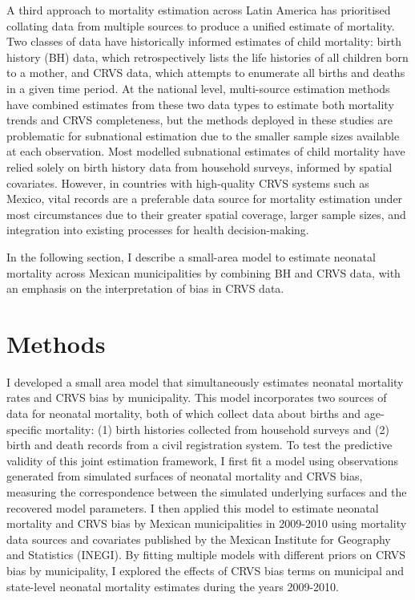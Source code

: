 \documentclass[
]{report}
\begin{document}
A third approach to mortality estimation across Latin America has prioritised collating data from multiple sources to produce a unified estimate of mortality. Two classes of data have historically informed estimates of child mortality: birth history (BH) data, which retrospectively lists the life histories of all children born to a mother, and CRVS data, which attempts to enumerate all births and deaths in a given time period. At the national level, multi-source estimation methods have combined estimates from these two data types to estimate both mortality trends and CRVS completeness,\autocite{Dicker2018,Fisker2019} but the methods deployed in these studies are problematic for subnational estimation due to the smaller sample sizes available at each observation. Most modelled subnational estimates of child mortality have relied solely on birth history data from household surveys, informed by spatial covariates.\autocite{Golding2017,Burstein2019,Wakefield2019} However, in countries with high-quality CRVS systems such as Mexico, vital records are a preferable data source for mortality estimation under most circumstances due to their greater spatial coverage, larger sample sizes, and integration into existing processes for health decision-making.\autocite{UnitedNationsStatisticsDivision2014}

In the following section, I describe a small-area model to estimate neonatal mortality across Mexican municipalities by combining BH and CRVS data, with an emphasis on the interpretation of bias in CRVS data.

\hypertarget{methods}{%
\section{Methods}\label{methods}}

I developed a small area model that simultaneously estimates neonatal mortality rates and CRVS bias by municipality. This model incorporates two sources of data for neonatal mortality, both of which collect data about births and age-specific mortality: (1) birth histories collected from household surveys and (2) birth and death records from a civil registration system. To test the predictive validity of this joint estimation framework, I first fit a model using observations generated from simulated surfaces of neonatal mortality and CRVS bias, measuring the correspondence between the simulated underlying surfaces and the recovered model parameters. I then applied this model to estimate neonatal mortality and CRVS bias by Mexican municipalities in 2009-2010 using mortality data sources and covariates published by the Mexican Institute for Geography and Statistics (INEGI). By fitting multiple models with different priors on CRVS bias by municipality, I explored the effects of CRVS bias terms on municipal and state-level neonatal mortality estimates during the years 2009-2010.
\end{document}
